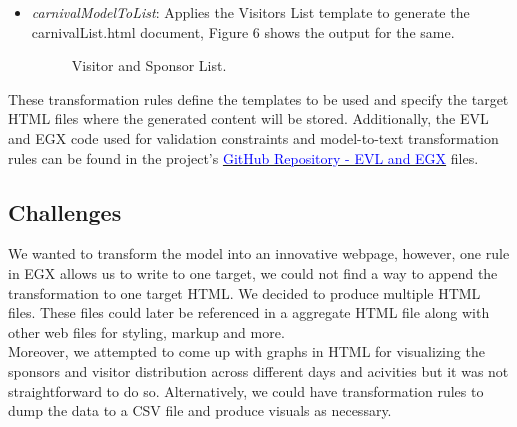 \documentclass[a4paper,11pt]{report}
\begin{document}
\begin{enumerate}[leftmargin=*]
\begin{itemize}[leftmargin=*]
\item {\it carnivalModelToList}: Applies the Visitors List template to generate the carnivalList.html document, Figure 6 shows the output for the same.

\begin{figure}[h]
	\begin{center}
		\caption{{\footnotesize Visitor and Sponsor List.}}
		\label{Fig6}
	\end{center}
\end{figure}	
\end{itemize}
\end{enumerate}
These transformation rules define the templates to be used and specify the target HTML files where the generated content will be stored. Additionally, the EVL and EGX code used for validation constraints and model-to-text transformation rules can be found in the project's  \href{https://github.com/samkithkjain/cas_703/tree/main/workspace/carnival/transformation}{\textcolor{blue}{ GitHub Repository - EVL and EGX}} files.

\subsection{Challenges}

We wanted to transform the model into an innovative webpage, however, one rule in EGX allows us to write to one target, we could not find a way to append the transformation to one target HTML. We decided to produce multiple HTML files. These files could later be referenced in a aggregate HTML file along with other web files for styling, markup and more.\\

Moreover, we attempted to come up with graphs in HTML for visualizing the sponsors and visitor distribution across different days and acivities but it was not straightforward to do so. Alternatively, we could have transformation rules to dump the data to a CSV file and produce visuals as necessary.
\end{document}
